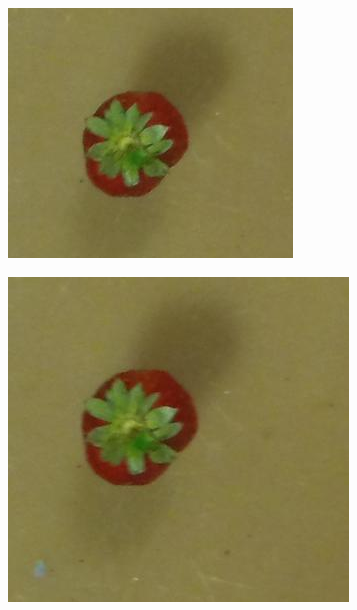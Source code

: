 \documentclass {udthesis}
\begin{document}
\begin{figure}
\begin{subfigure}[]{0.12\textwidth}
      \caption{}
  \end{subfigure}
  \begin{subfigure}[]{0.12\textwidth}
      \includegraphics[width=\textwidth]{strawberry4_obj_01/strawberry4_001_28}
      \caption{}
  \end{subfigure}
  \begin{subfigure}[]{0.12\textwidth}
      \includegraphics[width=\textwidth]{strawberry4_obj_01/strawberry4_001_26}

\end{subfigure}
\end{figure}
\end{document}
